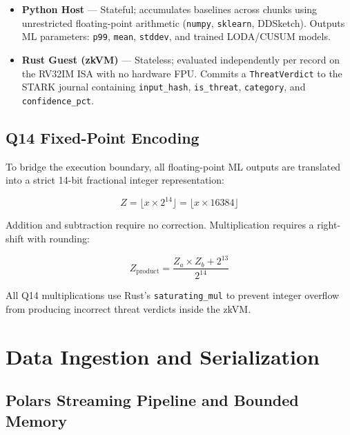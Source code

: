 \documentclass[12pt,a4paper]{article}
\begin{document}
\begin{itemize}
  \item \textbf{Python Host} --- Stateful; accumulates baselines across
        chunks using unrestricted floating-point arithmetic
        (\texttt{numpy}, \texttt{sklearn}, DDSketch). Outputs ML
        parameters: \texttt{p99}, \texttt{mean}, \texttt{stddev},
        and trained LODA/CUSUM models.
  \item \textbf{Rust Guest (zkVM)} --- Stateless; evaluated independently
        per record on the RV32IM ISA with no hardware FPU. Commits a
        \texttt{ThreatVerdict} to the STARK journal containing
        \texttt{input\_hash}, \texttt{is\_threat}, \texttt{category},
        and \texttt{confidence\_pct}.
\end{itemize}

\subsection{Q14 Fixed-Point Encoding}

To bridge the execution boundary, all floating-point ML outputs are
translated into a strict 14-bit fractional integer representation:

\begin{equation}
  Z = \lfloor x \times 2^{14} \rfloor = \lfloor x \times 16384 \rfloor
\end{equation}

Addition and subtraction require no correction. Multiplication requires
a right-shift with rounding:

\begin{equation}
  Z_{\text{product}} = \frac{Z_a \times Z_b + 2^{13}}{2^{14}}
\end{equation}

All Q14 multiplications use Rust's \texttt{saturating\_mul} to prevent
integer overflow from producing incorrect threat verdicts inside the zkVM.

\section{Data Ingestion and Serialization}

\subsection{Polars Streaming Pipeline and Bounded Memory}
\end{document}
